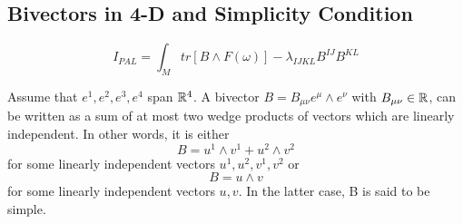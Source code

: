 \documentclass{article}
\begin{document}
\subsection{Bivectors in 4-D and Simplicity Condition}
\label{sec-3-1}
\begin{equation}
\label{}
I_{PAL} = \int_{M}tr \left[ B\wedge F(\omega) \right] - \lambda_{IJKL} B^{IJ}B^{KL}
\end{equation}
\begin{thm}
Assume that $e^1, e^2, e^3, e^4$ span $\mathbb R^4$. A bivector $B = B_{\mu \nu} e^{\mu}\wedge e^{\nu}$ with $B_{\mu \nu} \in \mathbb R$, can be written as a sum of at most two wedge products of vectors which are linearly independent. In other words, it is either
\begin{equation}
\label{}
B = u^1 \wedge v^1 + u^2 \wedge v^2
\end{equation}
for some linearly independent vectors $u^1,u^2,v^1,v^2$ or
\begin{equation}
\label{}
B = u \wedge v
\end{equation}
for some linearly independent vectors $u,v$. In the latter case, B is said to be simple.
\end{thm}
\end{document}
